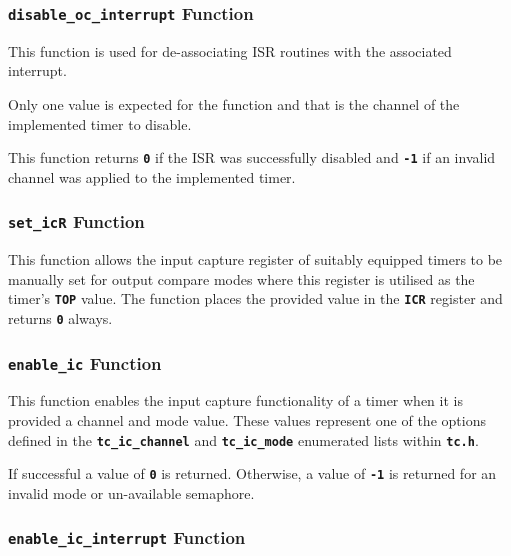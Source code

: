 \documentclass[a4paper, oneside, 11pt, titlepage, onecolumn, openright]{article}
\begin{document}
\subsubsection{\textbf{\texttt{disable\_oc\_interrupt}} Function}
			\label{sss:HALtcdisable_oc_interruptFunction}
			
			This function is used for de-associating ISR routines with the associated interrupt.
			
			Only one value is expected for the function and that is the channel of the implemented timer to disable.
			
			This function returns \textbf{\texttt{0}} if the ISR was successfully disabled and \textbf{\texttt{-1}} if an invalid channel was applied to the implemented timer.
			
\subsubsection{\textbf{\texttt{set\_icR}} Function}
			\label{sss:HALtcset_icRFunction}
			
			This function allows the input capture register of suitably equipped timers to be manually set for output compare modes where this register is utilised as the timer's \textbf{\texttt{TOP}} value.
			The function places the provided value in the \textbf{\texttt{ICR}} register and returns \textbf{\texttt{0}} always.
			
\subsubsection{\textbf{\texttt{enable\_ic}} Function}
			\label{sss:HALtcenable_icFunction}
			
			This function enables the input capture functionality of a timer when it is provided a channel and mode value. These values represent one of the options defined in the \textbf{\texttt{tc\_ic\_channel}} and \textbf{\texttt{tc\_ic\_mode}} enumerated lists within \textbf{\texttt{tc.h}}.
			
			If successful a value of \textbf{\texttt{0}} is returned. Otherwise, a value of \textbf{\texttt{-1}} is returned for an invalid mode or un-available semaphore.
			
\subsubsection{\textbf{\texttt{enable\_ic\_interrupt}} Function}
			\label{sss:HALtcenable_ic_interruptFunction}
			
\end{document}
